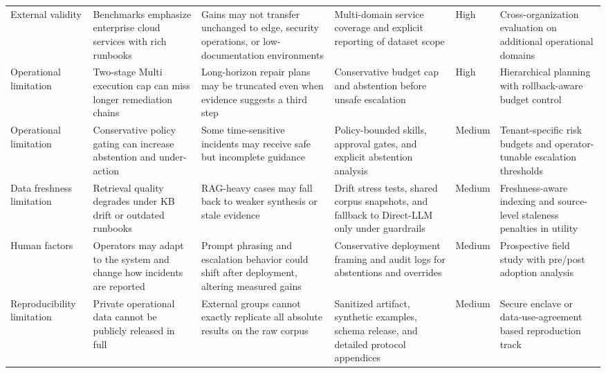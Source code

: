 \documentclass[conference]{IEEEtran}
\begin{document}
\begin{table}[t]
\begin{tabular}{p{1.8cm}p{3.0cm}p{3.2cm}p{4.0cm}p{1.3cm}p{3.8cm}}
External validity & Benchmarks emphasize enterprise cloud services with rich runbooks & Gains may not transfer unchanged to edge, security operations, or low-documentation environments & Multi-domain service coverage and explicit reporting of dataset scope & High & Cross-organization evaluation on additional operational domains \\
Operational limitation & Two-stage Multi execution cap can miss longer remediation chains & Long-horizon repair plans may be truncated even when evidence suggests a third step & Conservative budget cap and abstention before unsafe escalation & High & Hierarchical planning with rollback-aware budget control \\
Operational limitation & Conservative policy gating can increase abstention and under-action & Some time-sensitive incidents may receive safe but incomplete guidance & Policy-bounded skills, approval gates, and explicit abstention analysis & Medium & Tenant-specific risk budgets and operator-tunable escalation thresholds \\
Data freshness limitation & Retrieval quality degrades under KB drift or outdated runbooks & RAG-heavy cases may fall back to weaker synthesis or stale evidence & Drift stress tests, shared corpus snapshots, and fallback to Direct-LLM only under guardrails & Medium & Freshness-aware indexing and source-level staleness penalties in utility \\
Human factors & Operators may adapt to the system and change how incidents are reported & Prompt phrasing and escalation behavior could shift after deployment, altering measured gains & Conservative deployment framing and audit logs for abstentions and overrides & Medium & Prospective field study with pre/post adoption analysis \\
Reproducibility limitation & Private operational data cannot be publicly released in full & External groups cannot exactly replicate all absolute results on the raw corpus & Sanitized artifact, synthetic examples, schema release, and detailed protocol appendices & Medium & Secure enclave or data-use-agreement based reproduction track \\
\bottomrule
\end{tabular}
\end{table}
\end{document}
